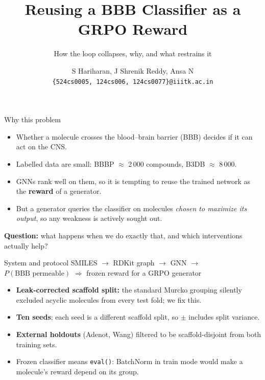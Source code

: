 \documentclass[aspectratio=169,11pt]{beamer}
\title{Reusing a BBB Classifier as a GRPO Reward}
\subtitle{How the loop collapses, why, and what restrains it}
\author{S Hariharan, J Shrenik Reddy, Ansa N\\
{\small\texttt{\{524cs0005, 124cs006, 124cs0077\}@iiitk.ac.in}}}
\institute{RECOMB 2027}
\date{}
\begin{document}
\begin{frame}[plain]\titlepage\end{frame}

\begin{frame}{Why this problem}
\begin{itemize}\itemsep4pt
  \item Whether a molecule crosses the blood--brain barrier (BBB) decides if it can act on the CNS.
  \item Labelled data are small: BBBP $\approx$ 2\,000 compounds, B3DB $\approx$ 8\,000.
  \item GNNs rank well on them, so it is tempting to reuse the trained network as the \textbf{reward} of a generator.
  \item But a generator queries the classifier on molecules \emph{chosen to maximize its output}, so any weakness is actively sought out.
\end{itemize}
\vspace{4pt}
\textbf{Question:} what happens when we do exactly that, and which interventions actually help?
\end{frame}

\begin{frame}{System and protocol}
\centering
SMILES $\rightarrow$ RDKit graph $\rightarrow$ GNN $\rightarrow$ $P(\text{BBB permeable})$ \quad $\Longrightarrow$ \quad frozen reward for a GRPO generator
\vspace{6pt}
\begin{itemize}\itemsep3pt
  \item \textbf{Leak-corrected scaffold split:} the standard Murcko grouping silently excluded acyclic molecules from every test fold; we fix this.
  \item \textbf{Ten seeds}; each seed is a different scaffold split, so $\pm$ includes split variance.
  \item \textbf{External holdouts} (Adenot, Wang) filtered to be scaffold-disjoint from both training sets.
  \item Frozen classifier means \texttt{eval()}: BatchNorm in train mode would make a molecule's reward depend on its group.
\end{itemize}
\end{frame}
\end{document}
